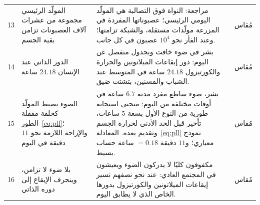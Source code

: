 {\begin{longtable}{>{\raggedright}p{0.5cm}>{\raggedright}p{4.0cm}>{\raggedright}p{5.6cm}>{\raggedright}p{2.3cm}>{\raggedright\arraybackslash}p{1.7cm}}
13 & المولّد الرئيسي مجموعة من عشرات آلاف العصبونات تزامن بقية الجسم & مراجعة: النواة فوق التصالبة هي المولّد اليومي الرئيسي؛ عصبوناتها المفردة في المزرعة مولّدات مستقلة، والشبكة تزامنها؛ وعند الفأر نحو $10^4$ عصبون في كل جانب. & \cite{Welsh2010scn} & مُقاس \\
14 & الدور الذاتي عند الإنسان $24.18$ ساعة & بشر في ضوء خافت وبجدول منفصل عن اليوم: دور إيقاعات الميلاتونين والحرارة والكورتيزول $24.18$ ساعة في المتوسط عند الشباب والمسنين، بتشتت ضيق. & \cite{Czeisler1999} & مُقاس \\
15 & الضوء يضبط المولّد كحلقة مقفلة الطور~\eqref{eq:pll}؛ والإزاحة اللازمة نحو $11$ دقيقة في اليوم & بشر، ضوء ساطع مفرد مدته $6.7$ ساعة في أوقات مختلفة من اليوم: منحنى استجابة طورية من النوع الأول بسعة $5$ ساعات، تأخير قبل الحد الأدنى لحرارة الجسم وتقديم بعده. المعادلة~\eqref{eq:pll} نموذج معياري؛ و$11$ دقيقة $=0.18$ ساعة حساب بسيط. & \cite{Khalsa2003prc} & مُقاس \\
16 & بلا ضوء لا تزامن، وينجرف الإيقاع إلى دوره الذاتي & مكفوفون كليًا لا يدركون الضوء ويعيشون في المجتمع العادي: عند نحو نصفهم تسير إيقاعات الميلاتونين والكورتيزول بدورها الخاص الذي لا يطابق اليوم. & \cite{Sack1992blind} & مُقاس \\
\bottomrule
\end{longtable}}
